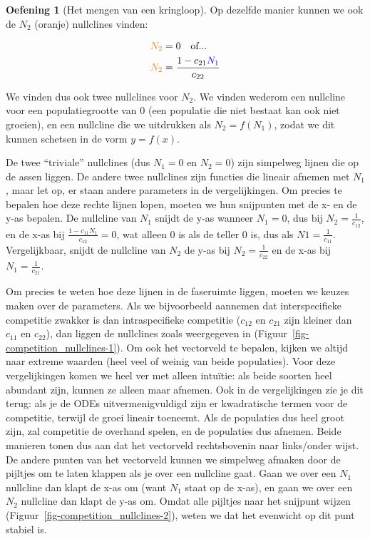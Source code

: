 \documentclass[
  a4paper,
]{scrbook}
\theoremstyle{definition}
\newtheorem{exercise}{Oefening}[chapter]
\theoremstyle{remark}
\begin{document}
\begin{exercise}[Het mengen van een
kringloop]
Op dezelfde manier kunnen we ook de \(N_2\) ({oranje}) nullclines
vinden:

\begin{align*}
\textcolor{orange}{N_2} &= 0 \quad \text{of...} \\
\textcolor{orange}{N_2} &= \frac{1 - c_{21}\textcolor{blue}{N_1}}{c_{22}}
\end{align*}

We vinden dus ook twee nullclines voor \(N_2\). We vinden wederom een
nullcline voor een populatiegrootte van 0 (een populatie die niet
bestaat kan ook niet groeien), en een nullcline die we uitdrukken als
\(N_2=f(N_1)\), zodat we dit kunnen schetsen in de vorm \(y=f(x)\).

De twee ``triviale'' nullclines (dus \(N_1=0\) en \(N_2=0\)) zijn
simpelweg lijnen die op de assen liggen. De andere twee nullclines zijn
functies die lineair afnemen met \(N_1\), maar let op, er staan andere
parameters in de vergelijkingen. Om precies te bepalen hoe deze rechte
lijnen lopen, moeten we hun snijpunten met de x- en de y-as bepalen. {De
nullcline van \(N_1\)} snijdt de y-as wanneer \(N_1=0\), dus bij
\(N_2=\frac{1}{c_{12}}\), en de x-as bij
\(\frac{1 - c_{11}N_1}{c_{12}}=0\), wat alleen 0 is als de teller 0 is,
dus als \(N1=\frac{1}{c_{11}}\). Vergelijkbaar, snijdt {de nullcline van
\(N_2\)} de y-as bij \(N_2=\frac{1}{c_{22}}\) en de x-as bij
\(N_1=\frac{1}{c_{21}}\).

Om precies te weten hoe deze lijnen in de faseruimte liggen, moeten we
keuzes maken over de parameters. Als we bijvoorbeeld aannemen dat
interspecifieke competitie zwakker is dan intraspecifieke competitie
(\(c_{12}\) en \(c_{21}\) zijn kleiner dan \(c_{11}\) en \(c_{22}\)),
dan liggen de nullclines zoals weergegeven in
(Figuur~\ref{fig-competition_nullclines-1}). Om ook het vectorveld te
bepalen, kijken we altijd naar extreme waarden (heel veel of weinig van
beide populaties). Voor deze vergelijkingen komen we heel ver met alleen
intuïtie: als beide soorten heel abundant zijn, kunnen ze alleen maar
afnemen. Ook in de vergelijkingen zie je dit terug: als je de ODEs
uitvermenigvuldigd zijn er kwadratische termen voor de competitie,
terwijl de groei lineair toeneemt. Als de populaties dus heel groot
zijn, zal competitie de overhand spelen, en de populaties dus afnemen.
Beide manieren tonen dus aan dat het vectorveld rechtsbovenin naar
links/onder wijst. De andere punten van het vectorveld kunnen we
simpelweg afmaken door de pijltjes om te laten klappen als je over een
nullcline gaat. Gaan we over een \(N_1\) nullcline dan klapt de x-as om
(want \(N_1\) staat op de x-as), en gaan we over een \(N_2\) nullcline
dan klapt de y-as om. Omdat alle pijltjes naar het snijpunt wijzen
(Figuur~\ref{fig-competition_nullclines-2}), weten we dat het evenwicht
op dit punt stabiel is.


\end{exercise}
\end{document}

